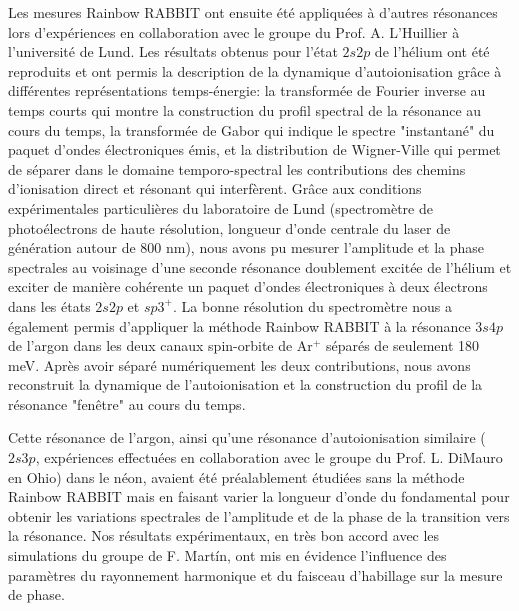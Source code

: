 Les mesures Rainbow RABBIT ont ensuite été appliquées à d'autres résonances lors d'expériences en collaboration avec le groupe du Prof. A. L'Huillier à l'université de Lund. Les résultats obtenus pour l'état $2s2p$ de l'hélium ont été reproduits et ont permis la description de la dynamique d'autoionisation grâce à différentes représentations temps-énergie: la transformée de Fourier inverse au temps courts qui montre la construction du profil spectral de la résonance au cours du temps, la transformée de Gabor qui indique le spectre "instantané" du paquet d'ondes électroniques émis, et la distribution de Wigner-Ville qui permet de séparer dans le domaine temporo-spectral les contributions des chemins d'ionisation direct et résonant qui interfèrent. Grâce aux conditions expérimentales particulières du laboratoire de Lund (spectromètre de photoélectrons de haute résolution, longueur d'onde centrale du laser de génération autour de 800 nm), nous avons pu mesurer l'amplitude et la phase spectrales au voisinage d'une seconde résonance doublement excitée de l'hélium et exciter de manière cohérente un paquet d'ondes électroniques à deux électrons dans les états $2s2p$ et $sp3^+$. La bonne résolution du spectromètre nous a également permis d'appliquer la méthode Rainbow RABBIT à la résonance $3s4p$ de l'argon dans les deux canaux spin-orbite de Ar$^+$ séparés de seulement 180 meV. Après avoir séparé numériquement les deux contributions, nous avons reconstruit la dynamique de l'autoionisation et la construction du profil de la résonance "fenêtre" au cours du temps. 

Cette résonance de l'argon, ainsi qu'une résonance d'autoionisation similaire ($2s3p$, expériences effectuées en collaboration avec le groupe du Prof. L. DiMauro en Ohio) dans le néon, avaient été préalablement étudiées sans la méthode Rainbow RABBIT mais en faisant varier la longueur d'onde du fondamental pour obtenir les variations spectrales de l'amplitude et de la phase de la transition vers la résonance. Nos résultats expérimentaux, en très bon accord avec les simulations du groupe de F. Mart\'{i}n, ont mis en évidence l'influence des paramètres du rayonnement harmonique et du faisceau d'habillage sur la mesure de phase.

